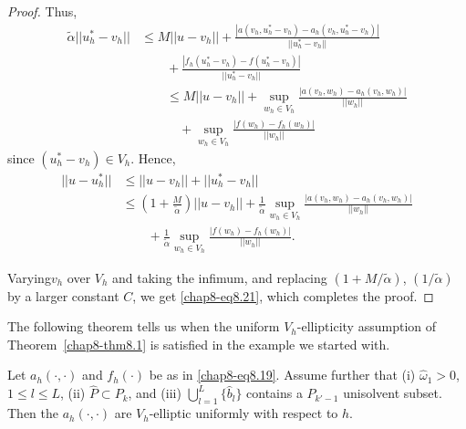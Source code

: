 \begin{proof}
Thus,
\begin{align*}
\widetilde{\alpha}||u^{*}_{h}-v_{h}|| &\leq
M||u-v_{h}||+\frac{|a(v_{h},u^{*}_{h}-v_{h})-a_{h}(v_{h},u^{*}_{h}-v_{h})|}{||u^{*}_{h}-v_{h}||}\\
&\qquad
+\frac{|f_{h}(u^{*}_{h}-v_{h})-f(u^{*}_{h}-v_{h})|}{||u^{*}_{h}-v_{h}||}\\
&\qquad \leq M||u-v_{h}||+\sup\limits_{w_{h}\in
  V_{h}}\frac{|a(v_{h},w_{h})-a_{h}(v_{h},w_{h})|}{||w_{h}||}\\
&\qquad\quad +\sup\limits_{w_{h}\in
  V_{h}}\frac{|f(w_{h})-f_{h}(w_{h})|}{||w_{h}||} 
\end{align*}
since $(u^{*}_{h}-v_{h})\in V_{h}$. Hence,
\begin{align*}
||u-u^{*}_{h}|| &\leq ||u-v_{h}||+||u^{*}_{h}-v_{h}||\\
&\leq
\left(1+\frac{M}{\widetilde{\alpha}}\right)||u-v_{h}||+\frac{1}{\widetilde{\alpha}}\sup\limits_{w_{h}\in
  V_{h}}\frac{|a(v_{h},w_{h})-a_{h}(v_{h},w_{h})|}{||w_{h}||}\\ 
&\qquad +\frac{1}{\widetilde{\alpha}}\sup\limits_{w_{h}\in V_{h}}\frac{|f(w_{h})-f_{h}(w_{h})|}{||w_{h}||}.
\end{align*}

Varying\pageoriginale $v_{h}$ over $V_{h}$ and taking the infimum, and
replacing $(1+M/\widetilde{\alpha})$, $(1/\widetilde{\alpha})$ by a
larger constant $C$, we get \eqref{chap8-eq8.21}, which completes the proof.
\end{proof}

The following theorem tells us when the uniform $V_{h}$-ellipticity
assumption of Theorem~\ref{chap8-thm8.1} is satisfied in the example
we started with.

\begin{theorem}\label{chap8-thm8.2}
Let $a_{h}(\cdot,\cdot)$ and $f_{h}(\cdot)$ be as in
\eqref{chap8-eq8.19}. Assume further that {\rm (i)}
$\hat{\omega}_{1}>0$, $1\leq l\leq L$, {\rm(ii)} $\hat{P}\subset
P_{k}$, and {\rm (iii)} $\bigcup\limits^{L}_{l=1}\{\hat{b}_{l}\}$
contains a $P_{k'-1}$ unisolvent subset. Then the $a_{h}(\cdot,\cdot)$
are $V_{h}$-elliptic uniformly with respect to $h$.
\end{theorem}

